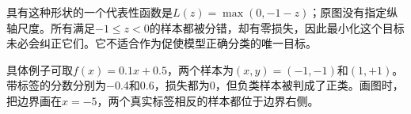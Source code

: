 具有这种形状的一个代表性函数是\(L(z)=\max(0,-1-z)\)；原图没有指定纵轴尺度。所有满足\(-1\le z<0\)的样本都被分错，却有零损失，因此最小化这个目标未必会纠正它们。它不适合作为促使模型正确分类的唯一目标。


具体例子可取\(f(x)=0.1x+0.5\)，两个样本为\((x,y)=(-1,-1)\)和\((1,+1)\)。带标签的分数分别为\ensuremath{-}0.4和0.6，损失都为0，但负类样本被判成了正类。画图时，把边界画在\(x=-5\)，两个真实标签相反的样本都位于边界右侧。
